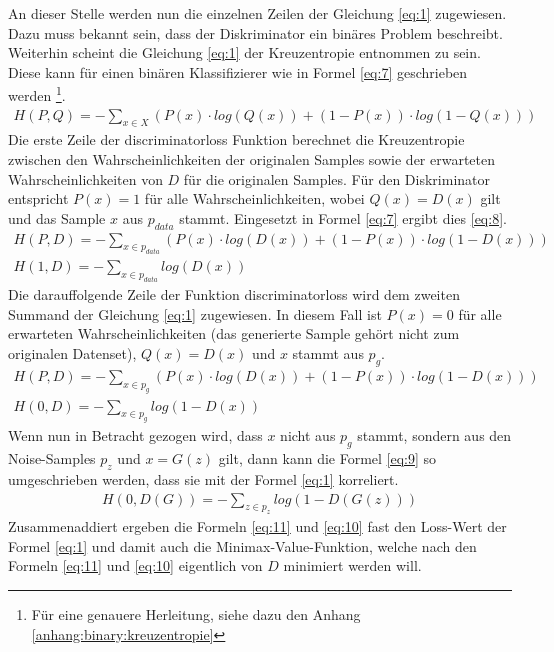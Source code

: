 An dieser Stelle werden nun die einzelnen Zeilen der Gleichung \ref{eq:1} zugewiesen. Dazu muss bekannt sein, dass der
Diskriminator ein binäres Problem beschreibt. Weiterhin scheint die Gleichung \ref{eq:1} der Kreuzentropie entnommen zu sein. Diese
kann für einen binären Klassifizierer wie in Formel \ref{eq:7} geschrieben werden \cite{stackoverflow:1:crossEntropy}
\footnote{Für eine genauere Herleitung, siehe dazu den Anhang \ref{anhang:binary:kreuzentropie}}.
\begin{align}
    H(P,Q) = - \sum_{x \in X} (P(x) \cdot log(Q(x)) + (1 - P(x)) \cdot log(1 - Q(x))) \label{eq:7}
\end{align}
Die erste Zeile der \glqq discriminator\textunderscore loss\grqq{} Funktion berechnet die Kreuzentropie zwischen den Wahrscheinlichkeiten der originalen Samples
sowie der erwarteten Wahrscheinlichkeiten von $D$ für die originalen Samples. Für den Diskriminator entspricht $P(x) = 1$ für alle Wahrscheinlichkeiten,
wobei $Q(x) = D(x)$ gilt und das Sample $x$ aus $p_{data}$ stammt. Eingesetzt in Formel \ref{eq:7} ergibt dies \ref{eq:8}.
\begin{align}
    H(P,D) = - \sum_{x \in p_{data}} (P(x) \cdot log(D(x)) + (1 - P(x)) \cdot log(1 - D(x))) \label{eq:8}\\
    H(1,D) = - \sum_{x \in p_{data}} log(D(x)) \label{eq:11}
\end{align}
Die darauffolgende Zeile der Funktion \glqq discriminator\textunderscore loss\grqq{} wird dem zweiten Summand der Gleichung \ref{eq:1} zugewiesen.
In diesem Fall ist $P(x) = 0$ für alle erwarteten Wahrscheinlichkeiten (das generierte Sample gehört nicht zum
originalen Datenset), $Q(x) = D(x)$ und $x$ stammt aus $p_{g}$.
\begin{align}
    H(P,D) = - \sum_{x \in p_{g}} (P(x) \cdot log(D(x)) + (1 - P(x)) \cdot log(1 - D(x)))\\
    H(0,D) = - \sum_{x \in p_{g}} log(1 - D(x)) \label{eq:9}
\end{align}
Wenn nun in Betracht gezogen wird, dass $x$ nicht aus $p_g$ stammt, sondern aus den Noise-Samples $p_z$ und $x = G(z)$ gilt,
dann kann die Formel \ref{eq:9} so umgeschrieben werden, dass sie mit der Formel \ref{eq:1} korreliert.
\begin{align}
    H(0,D(G)) = - \sum_{z \in p_{z}} log(1 - D(G(z))) \label{eq:10}
\end{align}
Zusammenaddiert ergeben die Formeln \ref{eq:11} und \ref{eq:10} fast den Loss-Wert der Formel \ref{eq:1} und damit auch die Minimax-Value-Funktion,
welche nach den Formeln \ref{eq:11} und \ref{eq:10} eigentlich von $D$ minimiert werden will.
